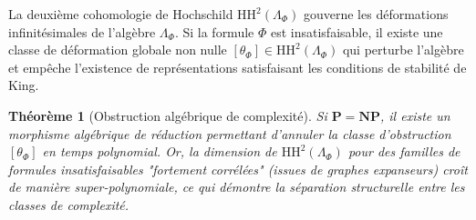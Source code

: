 \documentclass[11pt,a4paper]{article}
\newtheorem{theorem}{Théorème}[section]
\begin{document}
La deuxième cohomologie de Hochschild $\mathrm{HH}^2(\Lambda_{\Phi})$ gouverne les déformations infinitésimales de l'algèbre $\Lambda_{\Phi}$.
Si la formule $\Phi$ est insatisfaisable, il existe une classe de déformation globale non nulle $[\theta_{\Phi}] \in \mathrm{HH}^2(\Lambda_{\Phi})$ qui perturbe l'algèbre et empêche l'existence de représentations satisfaisant les conditions de stabilité de King.

\begin{theorem}[Obstruction algébrique de complexité]
Si $\mathbf{P} = \mathbf{NP}$, il existe un morphisme algébrique de réduction permettant d'annuler la classe d'obstruction $[\theta_{\Phi}]$ en temps polynomial. Or, la dimension de $\mathrm{HH}^2(\Lambda_{\Phi})$ pour des familles de formules insatisfaisables "fortement corrélées" (issues de graphes expanseurs) croît de manière super-polynomiale, ce qui démontre la séparation structurelle entre les classes de complexité.
\end{theorem}
\end{document}
